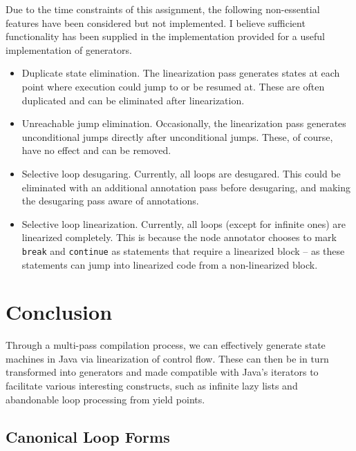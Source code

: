 \documentclass[journal,a4paper]{IEEEtran}
\begin{document}
Due to the time constraints of this assignment, the following non-essential features have been
considered but not implemented. I believe sufficient functionality has been supplied in the
implementation provided for a useful implementation of generators.

\begin{itemize}
\item Duplicate state elimination. The linearization pass generates states at each point where
      execution could jump to or be resumed at. These are often duplicated and can be eliminated
      after linearization.

\item Unreachable jump elimination. Occasionally, the linearization pass generates unconditional
      jumps directly after unconditional jumps. These, of course, have no effect and can be
      removed.

\item Selective loop desugaring. Currently, all loops are desugared. This could be eliminated with
      an additional annotation pass before desugaring, and making the desugaring pass aware of
      annotations.

\item Selective loop linearization. Currently, all loops (except for infinite ones) are linearized
      completely. This is because the node annotator chooses to mark \texttt{break} and
      \texttt{continue} as statements that require a linearized block -- as these statements can
      jump into linearized code from a non-linearized block.
\end{itemize}

\section{Conclusion}

Through a multi-pass compilation process, we can effectively generate state machines in Java via
linearization of control flow. These can then be in turn transformed into generators and made
compatible with Java's iterators to facilitate various interesting constructs, such as infinite
lazy lists and abandonable loop processing from yield points.

\appendix
\subsection{Canonical Loop Forms} \label{appendix:canonical-loop-forms}
\end{document}
